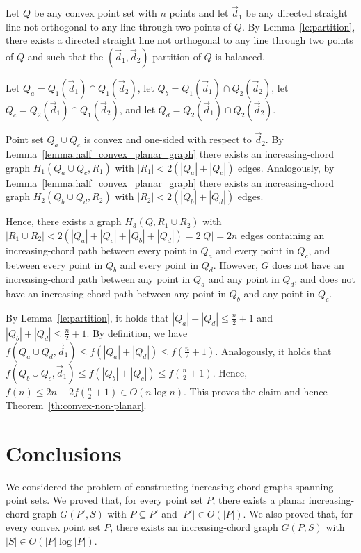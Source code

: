 \documentclass{llncs}
\begin{document}
Let $Q$ be any convex point set with $n$ points and let ${\vec d}_1$ be any directed straight line not orthogonal to any line through two points of $Q$. By Lemma~\ref{le:partition}, there exists a directed straight line not orthogonal to any line through two points of $Q$ and such that the $({\vec d}_1,{\vec d}_2)$-partition of $Q$ is balanced.

Let $Q_{a}=Q_{1}({\vec d}_1)\cap Q_{1}({\vec d}_2)$, let $Q_{b}=Q_{1}({\vec d}_1)\cap Q_{2}({\vec d}_2)$, let $Q_{c}=Q_{2}({\vec d}_1)\cap Q_{1}({\vec d}_2)$, and let $Q_{d}=Q_{2}({\vec d}_1)\cap Q_{2}({\vec d}_2)$.

Point set $Q_a\cup Q_c$ is convex and one-sided with respect to ${\vec d}_2$. By Lemma~\ref{lemma:half_convex_planar_graph} there exists an increasing-chord graph $H_1(Q_a\cup Q_c,R_1)$ with $|R_1|< 2(|Q_a|+|Q_c|)$ edges. Analogously, by Lemma~\ref{lemma:half_convex_planar_graph} there exists an increasing-chord graph $H_2(Q_b\cup Q_d,R_2)$ with $|R_2|<2(|Q_b|+|Q_d|)$ edges.

Hence, there exists a graph $H_3(Q,R_1\cup R_2)$ with $|R_1\cup R_2|< 2(|Q_a|+|Q_c|+|Q_b|+|Q_d|)=2|Q|=2n$ edges containing an increasing-chord path between every point in $Q_a$ and every point in $Q_c$, and between every point in $Q_b$ and every point in $Q_d$. However, $G$ does not have an increasing-chord path between any point in $Q_a$ and any point in $Q_d$, and does not have an increasing-chord path between any point in $Q_b$ and any point in $Q_c$.

By Lemma~\ref{le:partition}, it holds that $|Q_a|+|Q_d|\leq \frac{n}{2}+1$ and $|Q_b|+|Q_d|\leq \frac{n}{2}+1$. By definition, we have $f(Q_a\cup Q_d,{\vec d}_1)\leq f(|Q_a|+|Q_d|)\leq f(\frac{n}{2}+1)$. Analogously, it holds that $f(Q_b\cup Q_c,{\vec d}_1)\leq f(|Q_b|+|Q_c|)\leq f(\frac{n}{2}+1)$. Hence, $f(n)\leq 2n+2f(\frac{n}{2}+1)\in O(n\log n)$. This proves the claim and hence Theorem~\ref{th:convex-non-planar}.


\section{Conclusions}

We considered the problem of constructing increasing-chord graphs spanning point sets. We proved that, for every point set $P$, there exists a planar increasing-chord graph $G(P',S)$ with $P\subseteq P'$ and $|P'|\in O(|P|)$. We also proved that, for every convex point set $P$, there exists an increasing-chord graph $G(P,S)$ with $|S|\in O(|P| \log |P|)$.
\end{document}
